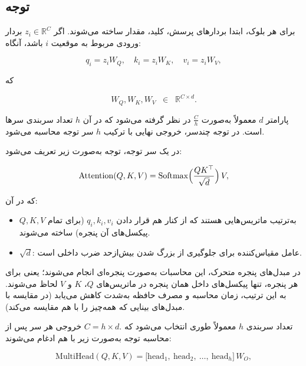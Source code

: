 \subsection{توجه}

برای هر بلوک، ابتدا بردارهای پرسش، کلید، مقدار ساخته می‌شوند.
اگر \(\displaystyle z_i \in \mathbb{R}^C\) بردار ورودی مربوط به موقعیت \(i\) باشد، آنگاه:

\begin{equation}
	q_i = z_i W_Q,
	\quad
	k_i = z_i W_K,
	\quad
	v_i = z_i W_V,
\end{equation}

که

\[
W_Q, W_K, W_V \;\;\in \;\;\mathbb{R}^{C \times d}.
\]

پارامتر \(\displaystyle d\) معمولاً به‌صورت \(\displaystyle \tfrac{C}{h}\) در نظر گرفته می‌شود
که در آن \(\displaystyle h\) تعداد سربندی سرها است.
در توجه چندسر، خروجی نهایی با ترکیب \(\displaystyle h\) سر توجه محاسبه می‌شود.

در یک سر توجه، توجه به‌صورت زیر تعریف می‌شود:

\begin{equation}
	\mathrm{Attention}(Q, K, V)
	=
	\mathrm{Softmax}\Bigl(\frac{QK^\top}{\sqrt{d}}\Bigr)\,V,
\end{equation}

که در آن:

\begin{itemize}
	\item \(\displaystyle Q, K, V\) به‌ترتیب ماتریس‌هایی هستند که از کنار هم قرار دادن
	\(\displaystyle q_i, k_i, v_i\) (برای تمام پیکسل‌های آن پنجره) ساخته می‌شوند.
	\item \(\displaystyle \sqrt{d}\): عامل مقیاس‌کننده برای جلوگیری از بزرگ شدن بیش‌ازحد ضرب داخلی است.
\end{itemize}

در مبدل‌های پنجره متحرک، این محاسبات به‌صورت پنجره‌ای انجام می‌شوند؛ یعنی
برای هر پنجره، تنها پیکسل‌های داخل همان پنجره در ماتریس‌های
\(\displaystyle Q\)، \(\displaystyle K\) و \(\displaystyle V\) لحاظ می‌شوند.
به این ترتیب، زمان محاسبه و مصرف حافظه به‌شدت کاهش می‌یابد
(در مقایسه با مبدل‌های بینایی که همه‌چیز را با هم مقایسه می‌کند).

تعداد سربندی \(\displaystyle h\) معمولاً طوری انتخاب می‌شود که
\(\displaystyle C = h \times d.\)
خروجی هر سر پس از محاسبه توجه به‌صورت زیر با هم ادغام می‌شوند:

\begin{equation}
	\mathrm{MultiHead}(Q,K,V)
	=
	\bigl[\text{head}_1,\ \text{head}_2,\ \dots,\ \text{head}_h\bigr]\,
	W_O,
\end{equation}

